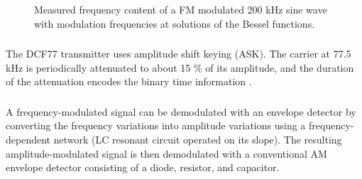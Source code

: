 \documentclass[a4paper,12pt]{article}
\begin{document}
	\begin{figure}[H]
		\centering
		
		\caption{Measured frequency content of a FM modulated 200 kHz sine wave with modulation frequencies at solutions of the Bessel functions.}
		\label{fig:446-200}
	\end{figure}
	
	
	\subsubsection{}
	The DCF77 transmitter uses amplitude shift keying (ASK). The carrier at 77.5 kHz is periodically attenuated to about 15 \% of its amplitude, and the duration of the attenuation encodes the binary time information \cite{wiki:DCF77}.
	
	\subsubsection{}

	A frequency-modulated signal can be demodulated with an envelope detector by converting the frequency variations into amplitude variations using a frequency-dependent network (LC resonant circuit operated on its slope). The resulting amplitude-modulated signal is then demodulated with a conventional AM envelope detector consisting of a diode, resistor, and capacitor.

	\vfill
	
		
	
	
	
	
\end{document}
